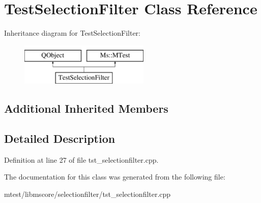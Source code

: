 \hypertarget{class_test_selection_filter}{}\section{Test\+Selection\+Filter Class Reference}
\label{class_test_selection_filter}
Inheritance diagram for Test\+Selection\+Filter\+:\begin{figure}[H]
\begin{center}
\leavevmode
\includegraphics[height=2.000000cm]{class_test_selection_filter}
\end{center}
\end{figure}
\subsection*{Additional Inherited Members}


\subsection{Detailed Description}


Definition at line 27 of file tst\+\_\+selectionfilter.\+cpp.



The documentation for this class was generated from the following file\+:\begin{DoxyCompactItemize}
\item 
mtest/libmscore/selectionfilter/tst\+\_\+selectionfilter.\+cpp\end{DoxyCompactItemize}
